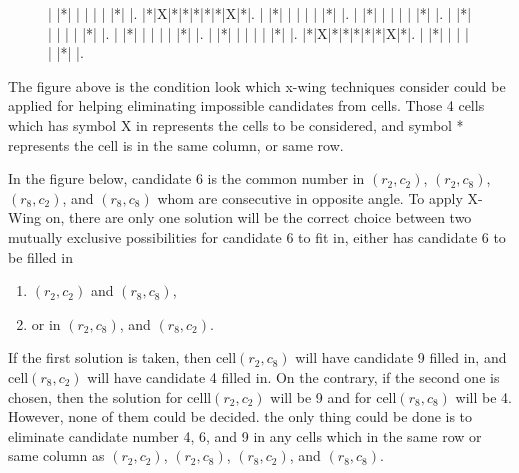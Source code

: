 \documentclass[11pt]{report}
\begin{document}
\begin{figure}
\begin{sudoku}
   | |*| | | | | |*| |.
   |*|X|*|*|*|*|*|X|*|.
   | |*| | | | | |*| |.
   | |*| | | | | |*| |.
   | |*| | | | | |*| |.
   | |*| | | | | |*| |.
   | |*| | | | | |*| |.
   |*|X|*|*|*|*|*|X|*|.
   | |*| | | | | |*| |.
\end{sudoku}
\label{xwingmodel}
\end{figure}

The figure above is the condition look which x-wing techniques consider could be applied for helping eliminating impossible candidates from cells. Those 4 cells which has symbol X in represents the cells to be considered, and symbol * represents the cell is in the same column, or same row. 

In the figure below, candidate 6 is the common number in $(r_{2}, c_{2})$, $(r_{2}, c_{8})$, $(r_{8}, c_{2})$, and $(r_{8}, c_{8})$ whom are consecutive in opposite angle. To apply X-Wing on, there are only one solution will be the correct choice between two mutually exclusive possibilities for candidate 6 to fit in, either has candidate 6 to be filled in 
\begin{enumerate}
  \item $(r_{2}, c_{2})$ and $(r_{8}, c_{8})$,
  \item or in $(r_{2}, c_{8})$, and $(r_{8}, c_{2})$.
\end{enumerate}
If the first solution is taken, then cell$(r_{2}, c_{8})$ will have candidate 9 filled in, and cell$(r_{8}, c_{2})$ will have candidate 4 filled in. On the contrary, if the second one is chosen, then the solution for celll$(r_{2}, c_{2})$ will be 9 and for cell$(r_{8}, c_{8})$ will be 4. However, none of them could be decided. the only thing could be done is to eliminate candidate number 4, 6, and 9 in any cells which in the same row or same column as $(r_{2}, c_{2})$, $(r_{2}, c_{8})$, $(r_{8}, c_{2})$, and $(r_{8}, c_{8})$.
\end{document}
